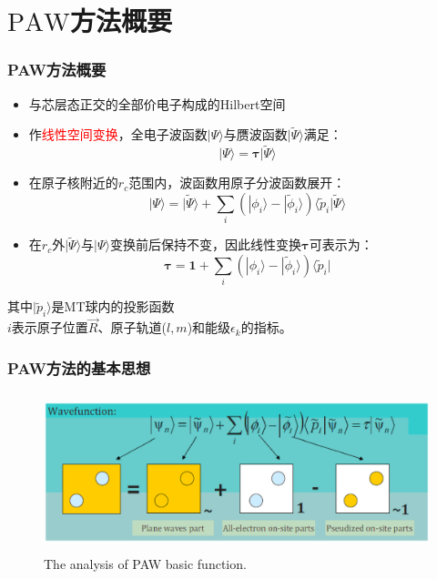 \documentclass[cjk,slidestop,compress,mathserif,blue]{beamer}
\begin{document}
\section{$\mathrm{PAW}$方法概要}
\frame
{
	\frametitle{\textrm{PAW}方法概要}
\begin{itemize}
	\item 与芯层态正交的全部价电子构成的\textrm{Hilbert}空间%
	\item 作\textcolor{red}{线性空间变换}，全电子波函数$|\Psi\rangle$与赝波函数$|\tilde\Psi\rangle$满足：
		$$|\Psi\rangle=\mathbf{\tau|}\tilde\Psi\rangle$$
	\item 在原子核附近的$r_c$范围内，波函数用原子分波函数展开：
	$$|\Psi\rangle=|\tilde\Psi\rangle+\sum_i(|\phi_i\rangle-|\tilde\phi_i\rangle)\langle\tilde p_i|\tilde\Psi\rangle$$
	\item 在$r_c$外$|\tilde\Psi\rangle$与$|\Psi\rangle$变换前后保持不变，因此线性变换$\mathbf{\tau}$可表示为：
	$$\mathbf{\tau}=\mathbf{1}+\sum_i(|\phi_i\rangle-|\tilde\phi_i\rangle)\langle\tilde p_i|$$
\end{itemize}
其中$|\tilde p_i\rangle$是\textrm{MT}球内的投影函数\\
$i$表示原子位置$\vec R$、原子轨道($l,m$)和能级$\epsilon_k$的指标。
}

\frame
{
	\frametitle{\textrm{PAW}方法的基本思想}
	\vspace{10pt}
\begin{figure}[h!]
\centering
\includegraphics[height=1.8in,width=4.in,viewport=30 210 570 440,clip]{Figures/PAW_projector.eps}
\caption{\small \textrm{The analysis of PAW basic function.}}%
\label{PAW_baisc}
\end{figure}
}
\end{document}
